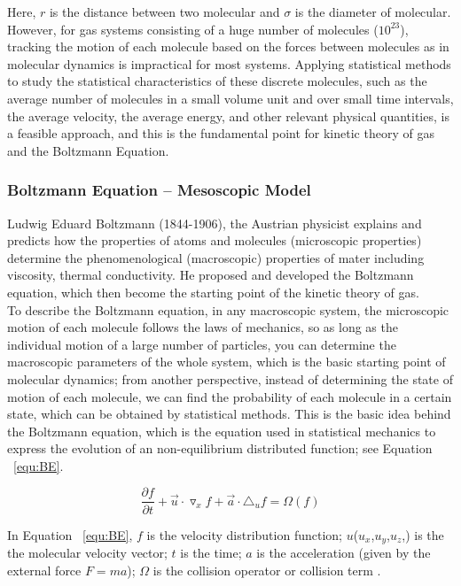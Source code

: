 Here, $r$ is the distance between two molecular and $\sigma$ is the diameter of molecular.\\

However, for gas systems consisting of a huge number of molecules ($10^{23}$), tracking the motion of each molecule based on the forces between molecules as in molecular dynamics is impractical for most systems. Applying statistical methods to study the statistical characteristics of these discrete molecules, such as the average number of molecules in a small volume unit and over small time intervals, the average velocity, the average energy, and other relevant physical quantities, is a feasible approach, and this is the fundamental point for kinetic theory of gas and the Boltzmann Equation.

\subsubsection{Boltzmann Equation -- Mesoscopic Model}
Ludwig Eduard Boltzmann (1844-1906), the Austrian physicist explains and predicts how the properties of atoms and molecules (microscopic properties) determine the phenomenological (macroscopic) properties of mater including viscosity, thermal conductivity\cite{lbmmbook}. He proposed and developed the Boltzmann equation, which then become the starting point of the kinetic theory of gas.\\

To describe the Boltzmann equation, in any macroscopic system, the microscopic motion of each molecule follows the laws of mechanics, so as long as the individual motion of a large number of particles, you can determine the macroscopic parameters of the whole system, which is the basic starting point of molecular dynamics; from another perspective, instead of determining the state of motion of each molecule, we can find the probability of each molecule in a certain state, which can be obtained by statistical methods. This is the basic idea behind the Boltzmann equation, which is the equation used in statistical mechanics to express the evolution of an non-equilibrium distributed function; see Equation ~\ref{equ:BE}.

\begin{equation}
\label{equ:BE}
    \frac {\partial f}{\partial t} + \vec u \cdot \triangledown _x f + \vec a \cdot \triangle _ u f = \Omega (f)
\end{equation}

In Equation ~\ref{equ:BE}, $f$ is the velocity distribution function; $u$($u_x$,$u_y$,$u_z$,) is the the molecular velocity vector; $t$ is the time; $a$ is the acceleration (given by the external force $F=ma$); $\Omega$ is the collision operator or collision term \cite{succi2001lattice}.

